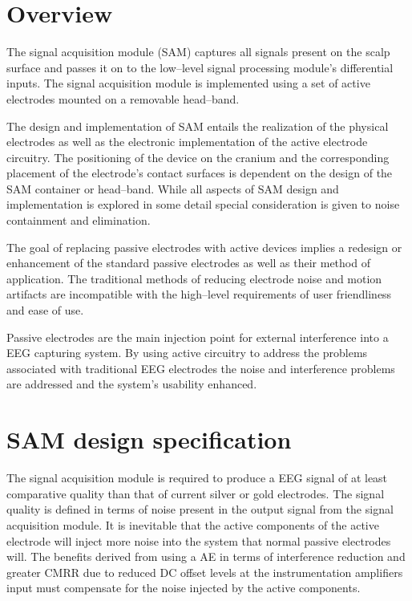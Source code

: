 
\section{Overview}

The signal acquisition module (SAM) captures all signals present on
the scalp surface and passes it on to the low--level signal processing
module's differential inputs. The signal acquisition module is
implemented using a set of active electrodes mounted on a removable
head--band.


The design and implementation of SAM entails the realization of the
physical electrodes as well as the electronic implementation of the
active electrode circuitry. The positioning of the device on the
cranium and the corresponding placement of the electrode's contact
surfaces is dependent on the design of the SAM container or
head--band. While all aspects of SAM design and implementation is
explored in some detail special consideration is given to noise
containment and elimination.


The goal of replacing passive electrodes with active devices implies a
redesign or enhancement of the standard passive electrodes as well as
their method of application. The traditional methods of reducing
electrode noise and motion artifacts are incompatible with the
high--level requirements of user friendliness and ease of use. 


Passive electrodes are the main injection point for external
interference into a EEG capturing system. By using active circuitry to
address the problems associated with traditional EEG electrodes the
noise and interference problems are addressed and the system's
usability enhanced.

\section{SAM design specification}

The signal acquisition module is required to produce a EEG signal of
at least comparative quality than that of current silver or gold
electrodes. The signal quality is defined in terms of noise present in
the output signal from the signal acquisition module. It is inevitable
that the active components of the active electrode will inject more
noise into the system that normal passive electrodes will. The
benefits derived from using a AE in terms of interference reduction
and greater CMRR due to reduced DC offset levels at the
instrumentation amplifiers input must compensate for the noise
injected by the active components.


